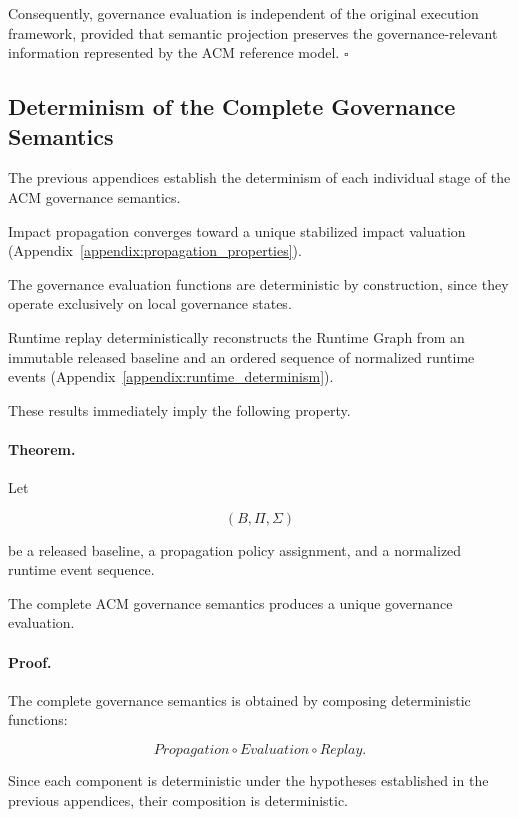 \documentclass[10pt]{article}
\begin{document}
Consequently, governance evaluation is independent of the original execution
framework, provided that semantic projection preserves the governance-relevant
information represented by the ACM reference model.
\hfill$\square$

\subsection{Determinism of the Complete Governance Semantics}
\label{appendix:global_determinism}

The previous appendices establish the determinism of each individual stage of
the ACM governance semantics.

Impact propagation converges toward a unique stabilized impact valuation
(Appendix~\ref{appendix:propagation_properties}).

The governance evaluation functions are deterministic by construction, since
they operate exclusively on local governance states.

Runtime replay deterministically reconstructs the Runtime Graph from an
immutable released baseline and an ordered sequence of normalized runtime events
(Appendix~\ref{appendix:runtime_determinism}).

These results immediately imply the following property.

\paragraph*{Theorem.}

Let

\[
(B,\Pi,\Sigma)
\]

be a released baseline, a propagation policy assignment, and a normalized
runtime event sequence.

The complete ACM governance semantics produces a unique governance evaluation.

\paragraph*{Proof.}

The complete governance semantics is obtained by composing deterministic
functions:

\[
Propagation
\circ
Evaluation
\circ
Replay.
\]

Since each component is deterministic under the hypotheses established in the
previous appendices, their composition is deterministic.
\end{document}
